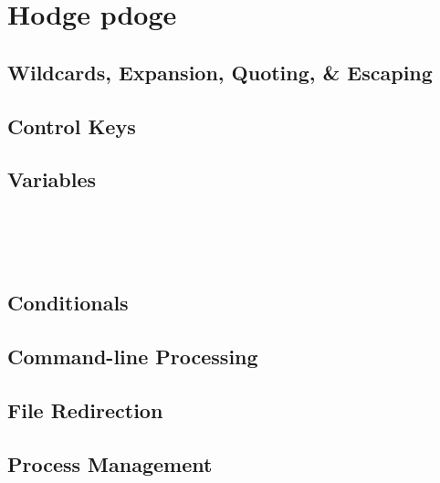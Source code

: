 \section{Hodge pdoge}




\subsection*{Wildcards, Expansion, Quoting, \& Escaping}





\subsection*{Control Keys}




\subsection*{Variables}

\entry{35mm}{}{}\\
\entry{35mm}{}{}\\
\entry{35mm}{}{}\\




\subsection*{Conditionals}





\subsection*{Command-line Processing}





\subsection*{File Redirection}





\subsection*{Process Management}




\subsection*{}

